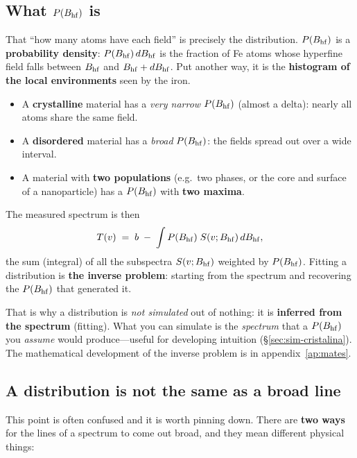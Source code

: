 \subsection{What $P(B_{\mathrm{hf}})$ is}

That ``how many atoms have each field'' is precisely the distribution. $P(B_{\mathrm{hf}})$ is
a \textbf{probability density}: $P(B_{\mathrm{hf}})\,dB_{\mathrm{hf}}$ is the fraction of Fe atoms whose
hyperfine field falls between $B_{\mathrm{hf}}$ and $B_{\mathrm{hf}} + dB_{\mathrm{hf}}$. Put another way, it is the
\textbf{histogram of the local environments} seen by the iron.

\begin{itemize}[nosep]
  \item A \textbf{crystalline} material has a \emph{very narrow} $P(B_{\mathrm{hf}})$ (almost a
        delta): nearly all atoms share the same field.
  \item A \textbf{disordered} material has a \emph{broad} $P(B_{\mathrm{hf}})$: the fields
        spread out over a wide interval.
  \item A material with \textbf{two populations} (e.g.\ two phases, or the core and
        surface of a nanoparticle) has a $P(B_{\mathrm{hf}})$ with \textbf{two maxima}.
\end{itemize}

The measured spectrum is then
\[
  T(v) \;=\; b \;-\; \int P(B_{\mathrm{hf}})\; S(v;B_{\mathrm{hf}})\, dB_{\mathrm{hf}},
\]
the sum (integral) of all the subspectra $S(v;B_{\mathrm{hf}})$ weighted by $P(B_{\mathrm{hf}})$. Fitting
a distribution is \textbf{the inverse problem}: starting from the spectrum and
recovering the $P(B_{\mathrm{hf}})$ that generated it.

\begin{nota}
That is why a distribution is \emph{not simulated} out of nothing: it is
\textbf{inferred from the spectrum} (fitting). What you can simulate is the
\emph{spectrum} that a $P(B_{\mathrm{hf}})$ you \emph{assume} would produce---useful for
developing intuition (\S\ref{sec:sim-cristalina}). The mathematical development of
the inverse problem is in appendix~\ref{ap:mates}.
\end{nota}

\subsection{A distribution is not the same as a broad line}

This point is often confused and it is worth pinning down. There are \textbf{two
ways} for the lines of a spectrum to come out broad, and they mean different
physical things:

